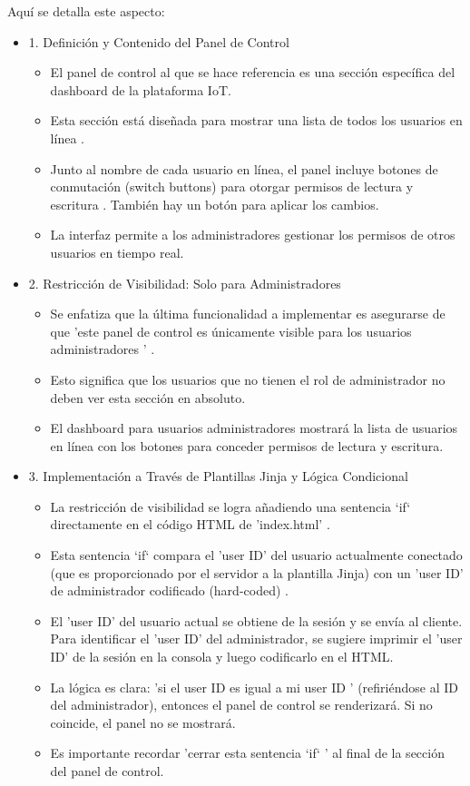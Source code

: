 \documentclass{report}
\begin{document}
Aquí se detalla este aspecto:
\begin{itemize}
    \item 1. Definición y Contenido del Panel de Control
    \begin{itemize}
        \item El panel de control al que se hace referencia es una sección específica del dashboard de la plataforma IoT.
        \item Esta sección está diseñada para mostrar una  lista de todos los usuarios en línea .
        \item Junto al nombre de cada usuario en línea, el panel incluye  botones de conmutación (switch buttons)  para  otorgar permisos de lectura y 
        escritura . También hay un botón para aplicar los cambios.
        \item La interfaz permite a los administradores gestionar los permisos de otros usuarios en tiempo real.
    \end{itemize}

    \item 2. Restricción de Visibilidad: Solo para Administradores
    \begin{itemize}
        \item Se enfatiza que la última funcionalidad a implementar es asegurarse de que   'este panel de control es únicamente visible para los 
        usuarios administradores ' .
        \item Esto significa que los usuarios que no tienen el rol de administrador no deben ver esta sección en absoluto.
        \item El dashboard para usuarios administradores mostrará la lista de usuarios en línea con los botones para conceder permisos de lectura y escritura.    
    \end{itemize}

    \item 3. Implementación a Través de Plantillas Jinja y Lógica Condicional
    \begin{itemize}
        \item La restricción de visibilidad se logra añadiendo una  sentencia `if` directamente en el código HTML de 'index.html' .
        \item Esta sentencia `if` compara el 'user ID' del usuario actualmente conectado (que es proporcionado por el servidor a la plantilla Jinja) 
        con un  'user ID' de administrador codificado (hard-coded) .
        \item El 'user ID' del usuario actual se obtiene de la sesión y se envía al cliente. Para identificar el 'user ID' del administrador, se 
        sugiere imprimir el 'user ID' de la sesión en la consola y luego codificarlo en el HTML.
        \item La lógica es clara:   'si el user ID es igual a mi user ID '  (refiriéndose al ID del administrador), entonces el panel de control se 
        renderizará. Si no coincide, el panel no se mostrará.
        \item Es importante recordar   'cerrar esta sentencia `if` '  al final de la sección del panel de control.    
    \end{itemize}


\end{itemize}
\end{document}
